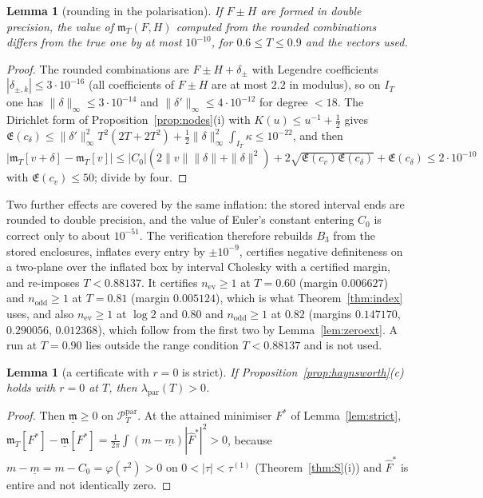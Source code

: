 \documentclass[11pt]{amsart}
\newtheorem{lemma}[theorem]{Lemma}
\theoremstyle{definition}
\theoremstyle{remark}
\newcommand{\PT}{\mathcal P_T}
\newcommand{\IT}{I_T}
\newcommand{\Fh}{\widehat F}
\newcommand{\Lev}{\mathfrak E}
\newcommand{\mT}{\mathfrak m_T}
\begin{document}
\begin{lemma}[rounding in the polarisation]\label{lem:polround}
If $F\pm H$ are formed in double precision, the value of $\mT(F,H)$ computed from
the rounded combinations differs from the true one by at most $10^{-10}$, for $0.6\le T\le0.9$ and the
vectors used.
\end{lemma}
\begin{proof}
The rounded combinations are $F\pm H+\delta_\pm$ with Legendre coefficients $|\delta_{\pm,k}|\le3\cdot10^{-16}$
(all coefficients of $F\pm H$ are at most $2.2$ in modulus), so on $\IT$ one has
$\|\delta\|_\infty\le3\cdot10^{-14}$ and $\|\delta'\|_\infty\le4\cdot10^{-12}$ for degree $<18$. The
Dirichlet form of Proposition~\ref{prop:nodes}(i) with $K(u)\le u^{-1}+\frac12$ gives
$\Lev(c_\delta)\le\|\delta'\|_\infty^2T^2(2T+2T^2)+\frac12\|\delta\|_\infty^2\int_{\IT}\kappa\le10^{-22}$,
and then
$|\mT[v+\delta]-\mT[v]|\le|C_0|(2\|v\|\|\delta\|+\|\delta\|^2)+2\sqrt{\Lev(c_v)\Lev(c_\delta)}+\Lev(c_\delta)\le2\cdot10^{-10}$
with $\Lev(c_v)\le50$; divide by four.
\end{proof}
Two further effects are covered by the same inflation: the stored interval ends are rounded to double
precision, and the value of Euler's constant entering $C_0$ is correct only to about $10^{-51}$. The
verification therefore rebuilds $B_3$ from the stored enclosures, inflates every entry by $\pm10^{-9}$, certifies negative definiteness on
a two-plane over the inflated box by interval Cholesky with a certified margin, and re-imposes
$T<0.88137$. It certifies $n_{\mathrm{ev}}\ge1$ at $T=0.60$ (margin $0.006627$) and $n_{\mathrm{odd}}\ge1$
at $T=0.81$ (margin $0.005124$), which is what Theorem~\ref{thm:index} uses, and also $n_{\mathrm{ev}}\ge1$
at $\log2$ and $0.80$ and $n_{\mathrm{odd}}\ge1$ at $0.82$ (margins $0.147170$, $0.290056$, $0.012368$),
which follow from the first two by Lemma~\ref{lem:zeroext}. A run at $T=0.90$ lies outside the range
condition $T<0.88137$ and is not used.


\begin{lemma}[a certificate with $r=0$ is strict]\label{lem:rzero}
If Proposition~\ref{prop:haynsworth}(c) holds with $r=0$ at $T$, then
$\lambda_{\mathrm{par}}(T)>0$.
\end{lemma}
\begin{proof}
Then $\underline{\mathfrak m}\ge0$ on $\PT^{\mathrm{par}}$. At the attained minimiser $F^*$ of
Lemma~\ref{lem:strict}, $\mT[F^*]-\underline{\mathfrak m}[F^*]=\frac1{2\pi}\int(m-\underline m)|\Fh^*|^2>0$,
because $m-\underline m=m-C_0=\varphi(\tau^2)>0$ on $0<|\tau|<\tau^{(1)}$ (Theorem~\ref{thm:S}(i)) and
$\Fh^*$ is entire and not identically zero.
\end{proof}
\end{document}
